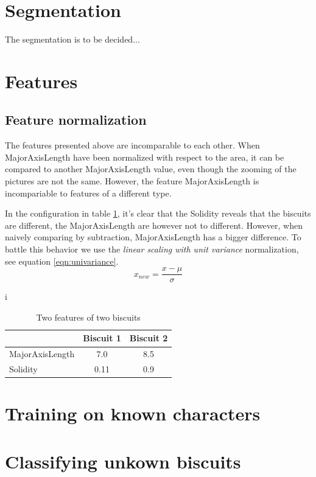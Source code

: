 \documentclass[a4paper,11pt]{article}
\begin{document}
\section{Segmentation}
The segmentation is to be decided...
\section{Features}
\subsection{Feature normalization}
The features presented above are incomparable to each other.
When MajorAxisLength have been normalized with respect to the area, 
it can be compared to another MajorAxisLength value, 
even though the zooming of the pictures are not the same. 
However, the feature MajorAxisLength is incompariable to features of a different type.

In the configuration in table \ref{tab:features}, it's clear that the Solidity reveals that the biscuits
are different, the MajorAxisLength are however not to different.
However, when naively comparing by subtraction, MajorAxisLength has a bigger difference.
To battle this behavior we use the \emph{linear scaling with unit variance} normalization, see equation \ref{eqn:univariance}.
\begin{equation}
x_{new} = \frac{x-\mu}{\sigma}
\label{eqn:univariance}
\end{equation}

\begin{table}[h!b!p!]
\caption{Two features of two biscuits}
\begin{center}i
    \begin{tabular}{ l | c | c | }
                    & Biscuit 1 & Biscuit 2 \\ \hline
    MajorAxisLength & 7.0       & 8.5       \\ \hline
    Solidity        & 0.11      & 0.9       \\ \hline
    \end{tabular}
\end{center}
\label{tab:features}
\end{table}

\section{Training on known characters}
\section{Classifying unkown biscuits}
\end{document}
